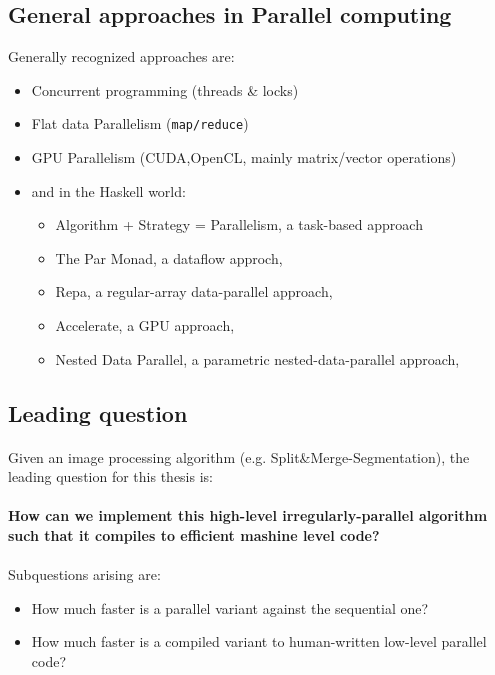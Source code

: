 \documentclass{article}
\newcommand{\algo}[0]{Split\&Merge-Segmentation}
\begin{document}
    \subsection{General approaches in Parallel computing}
    Generally recognized approaches are:
    \begin{itemize}
        \item Concurrent programming (threads \& locks)
        \item Flat data Parallelism (\texttt{map/reduce})
        \item GPU Parallelism (CUDA,OpenCL, mainly matrix/vector operations)
        \item and in the Haskell world: \cite{Marlow2012Parallel}
        \begin{itemize}
            \item Algorithm + Strategy = Parallelism, a task-based approach \cite{Trinder1998Algorithm}
            \item The Par Monad, a dataflow approch, \cite{Marlow2011Monad}
            \item Repa, a regular-array data-parallel approach, \cite{Keller2010Regular}
            \item Accelerate, a GPU approach, \cite{McDonell2013Optimising}           
            \item Nested Data Parallel, a parametric nested-data-parallel approach, \cite{Chakravarty2007Data}
        \end{itemize}
    \end{itemize}
    
    
    \subsection{Leading question}
    \paragraph{}
        Given an image processing algorithm (e.g. \algo), the leading question for this thesis is:
    
    \paragraph{How can we implement this high-level irregularly-parallel algorithm such that it compiles to efficient mashine level code?}
    
    \paragraph{}
    Subquestions arising are:
        \begin{itemize}
        \item How much faster is a parallel variant against the sequential one?
        \item How much faster is a compiled variant to human-written low-level parallel code?
        \end{itemize}
    
\end{document}

